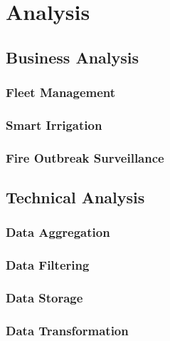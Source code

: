 \chapter{Analysis}
\label{chap:analysis}

\section{Business Analysis}
\label{sec:analysis:business_analysis}

\subsection{Fleet Management}
\label{subsec:analysis:business_analysis:fleet_management}

\subsection{Smart Irrigation}
\label{subsec:analysis:business_analysis:smart_irrigation}

\subsection{Fire Outbreak Surveillance}
\label{subsec:analysis:business_analysis:fire_outbreak_surveillance}

\section{Technical Analysis}
\label{sec:analysis:technical_analysis}

\subsection{Data Aggregation}
\label{subsec:analysis:technical_analysis:data_aggregation}

\subsection{Data Filtering}
\label{subsec:analysis:technical_analysis:data_filtering}

\subsection{Data Storage}
\label{subsec:analysis:technical_analysis:data_storage}

\subsection{Data Transformation}
\label{subsec:analysis:technical_analysis:data_transformation}

